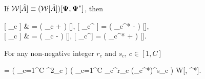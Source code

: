 \begin{theorem}
\label{thm:func-wigner:mc-correspondences}
    If $\mathcal{W} [ \hat{A} ] \equiv (\mathcal{W} [ \hat{A} ]) [\boldsymbol{\Psi}, \boldsymbol{\Psi}^*]$, then
    \begin{eqn*}
    	 [ \Psiop_c  ]
    		& = \left( \Psi_c +   \right) [],
    	\quad
    	 [ \Psiop_c^\dagger {} ]
    		= \left( \Psi_c^* -   \right) [], \\
    	 [  \Psiop_c ]
    		& = \left( \Psi_c -   \right) [],
    	\quad
    	 [  \Psiop_c^\dagger ]
    		= \left( \Psi_c^* +   \right) [].
    \end{eqn*}
\end{theorem}

\begin{theorem}
\label{thm:func-wigner:mc-moments}
	For any non-negative integer $r_c$ and $s_c$, $c \in [1, C]$
	\begin{eqn*}
	    \langle {} \rangle
		= \left( \prod_{c=1}^C \int \delta^2\Psi_c \right)
		\left( \prod_{c=1}^C \Psi_c^{r_c} (\Psi_c^*)^{s_c} \right) W[\Psivec, \Psivec^*].
	\end{eqn*}
\end{theorem}
